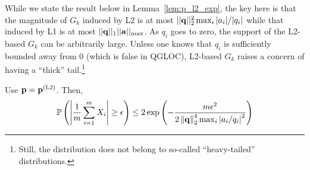 While we state the result below in Lemma~\ref{lem:p_l2_exp}, the key here is that the magnitude of $G_k$ induced by L2 is at most $||{{\mathbf q}}||_2^2 \max_i |a_i|/|q_i|$ while that induced by L1 is at most $||{{\mathbf q}}||_1 ||\mathbf{a}||_{\max} $.
As $q_i$ goes to zero, the support of the L2-based $G_k$ can be arbitrarily large.
Unless one knows that $q_i$ is sufficiently bounded away from 0 (which is false in QGLOC), L2-based $G_k$ raises a concern of having a ``thick'' tail.\footnote{
  Still, the distribution does not belong to so-called ``heavy-tailed'' distributions.
}
\begin{lem}\label{lem:p_l2_exp}
  Use ${{\mathbf p}} = {{\mathbf p}}^{(\text{L2})}$. Then,
  \begin{equation*}\begin{aligned}
    \mathbb{P} \left( \left\vert \frac{1}{m} \sum_{i=1}^m  X_i \right\vert \geq \epsilon \right) \leq 2 \exp \left(- \frac{ m \epsilon^2}{2 \left\Vert \mathbf{q} \right\Vert_2^4 \max_i \left\vert a_i/q_i \right\vert^2 } \right) \\
  \end{aligned}\end{equation*}
\end{lem}
